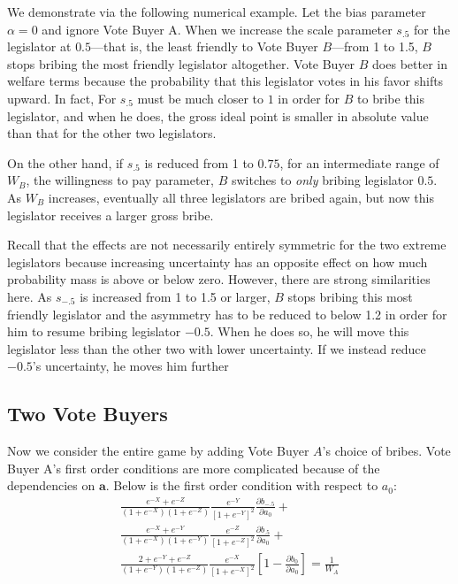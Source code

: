 \documentclass[12pt]{article}
\newcommand{\al}{\alpha}
\begin{document}
We demonstrate via the following numerical example. Let the bias parameter $\al=0$ and ignore Vote Buyer A. When we increase the scale parameter $s_{.5}$ for the legislator at $0.5$---that is, the least friendly to Vote Buyer $B$---from 1 to 1.5, $B$ stops bribing the most friendly legislator altogether. Vote Buyer $B$ does better in welfare terms because the probability that this legislator votes in his favor shifts upward. In fact, For $s_{.5}$ must be much closer to $1$ in order for $B$ to bribe this legislator, and when he does, the gross ideal point is smaller in absolute value than that for the other two legislators.

On the other hand, if $s_{.5}$ is reduced from 1 to $0.75$, for an intermediate range of $W_B$, the willingness to pay parameter, $B$ switches to \textit{only} bribing legislator $0.5$. As $W_B$ increases, eventually all three legislators are bribed again, but now this legislator receives a larger gross bribe.

Recall that the effects are not necessarily entirely symmetric for the two extreme legislators because increasing uncertainty has an opposite effect on how much probability mass is above or below zero. However, there are strong similarities here. As $s_{-.5}$ is increased from 1 to 1.5 or larger, $B$ stops bribing this most friendly legislator and the asymmetry has to be reduced to below 1.2 in order for him to resume bribing legislator $-0.5$. When he does so, he will move this legislator less than the other two with lower uncertainty. If we instead reduce $-0.5$'s uncertainty, he moves him further
		
		
\subsection{Two Vote Buyers}		
Now we consider the entire game by adding Vote Buyer $A$'s choice of bribes. Vote Buyer A's first order conditions are more complicated because of the dependencies on $\bm a$. Below is the first order condition with respect to $a_0$:
			 \begin{multline}
					 \frac{e^{-X} + e^{-Z}}{\left(1+e^{-X}\right)\left(1+e^{-Z}\right)} \frac{e^{-Y}}{\left[1+e^{-Y}\right]^2} \frac{\partial b_{-.5}}{\partial a_0} + \\ 
					\frac{e^{-X} + e^{-Y}}{\left(1+e^{-X}\right)\left(1+e^{-Y}\right)} \frac{e^{-Z}}{\left[1+e^{-Z}\right]^2}\frac{\partial b_{.5}}{\partial a_0} + \\
					\frac{2+e^{-Y} + e^{-Z}}{\left(1+e^{-Y}\right)\left(1+e^{-Z}\right)} \frac{e^{-X}}{\left[1+e^{-X}\right]^2}\left[1 - \frac{\partial b_0}{\partial a_0} \right] = \frac{1}{W_A}
					\label{eq:focA}
				\end{multline}
\end{document}
